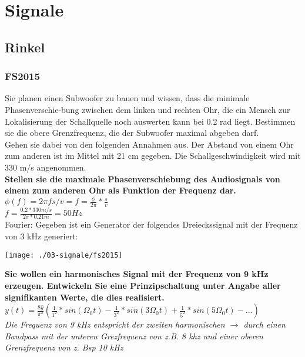 

\section{Signale}
\subsection{Rinkel}
\subsubsection{FS2015}
Sie planen einen Subwoofer zu bauen und wissen, dass die minimale Phasenverschie-bung zwischen dem linken und rechten Ohr, die ein Mensch zur Lokalisierung der Schallquelle noch auswerten kann bei 0.2 rad liegt.
Bestimmen sie die obere Grenzfrequenz, die der Subwoofer maximal abgeben darf.\\

Gehen sie dabei von den folgenden Annahmen aus. Der Abstand von einem Ohr zum anderen ist  im Mittel mit 21 cm gegeben. Die Schallgeschwindigkeit wird mit 330 m/s angenommen.\\

\textbf{Stellen sie die maximale Phasenverschiebung des Audiosignals von einem zum anderen Ohr als Funktion der Frequenz dar.\\}
$\phi(f)=2\pi f s/v = f = \frac{\phi}{2\pi}*\frac{s}{v}$\\
$f=\frac{0.2*330 m/s}{2\pi*0.21m} = 50 Hz$\\

Fourier:  Gegeben ist ein Generator der folgendes Dreieckssignal mit der Frequenz von 3 kHz generiert:
\begin{center}
    \vspace{-8pt}
    \texttt{[image: ./03-signale/fs2015]}
    \vspace{-8pt}
\end{center}

\textbf{Sie wollen ein harmonisches Signal mit der Frequenz von 9 kHz erzeugen. Entwickeln Sie eine Prinzipschaltung unter Angabe aller signifikanten Werte, die dies realisiert.}\\
$y(t)=\frac{8\hat{y}}{\pi^2}(\frac{1}{1^2}*sin(\Omega_0 t)-\frac{1}{3^2}*sin(3\Omega_0 t)+\frac{1}{5^2}*sin(5\Omega_0 t)-...)$\\
\textit{Die Frequenz von 9 kHz entspricht der zweiten harmonischen $\rightarrow$ durch einen Bandpass mit der unteren Grezfrequenz von z.B. 8 khz und einer oberen Grenzfrequenz von z. Bsp 10 kHz }\\

